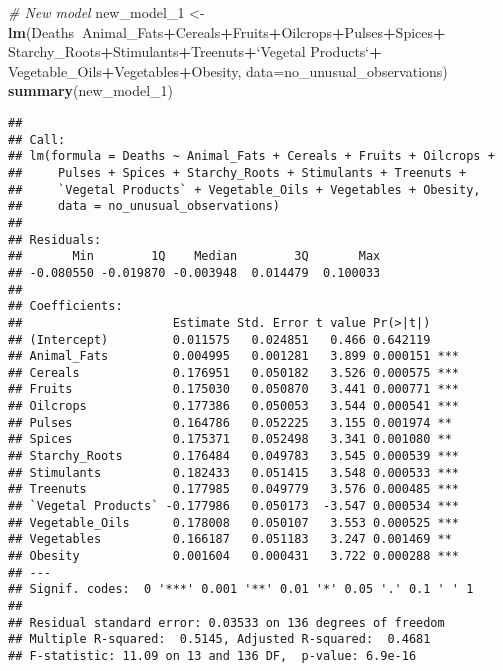 \documentclass[
]{article}
\newenvironment{Shaded}{\begin{snugshade}}{\end{snugshade}}
\newcommand{\CommentTok}[1]{\textcolor[rgb]{0.56,0.35,0.01}{\textit{#1}}}
\newcommand{\DataTypeTok}[1]{\textcolor[rgb]{0.13,0.29,0.53}{#1}}
\newcommand{\DecValTok}[1]{\textcolor[rgb]{0.00,0.00,0.81}{#1}}
\newcommand{\KeywordTok}[1]{\textcolor[rgb]{0.13,0.29,0.53}{\textbf{#1}}}
\newcommand{\NormalTok}[1]{#1}
\newcommand{\OperatorTok}[1]{\textcolor[rgb]{0.81,0.36,0.00}{\textbf{#1}}}
\newcommand{\StringTok}[1]{\textcolor[rgb]{0.31,0.60,0.02}{#1}}
\begin{document}
\begin{Shaded}
\begin{Highlighting}[]
\CommentTok{# New model }
\NormalTok{new_model_}\DecValTok{1}\NormalTok{ <-}\StringTok{ }\KeywordTok{lm}\NormalTok{(Deaths}\OperatorTok{~}\NormalTok{Animal_Fats}\OperatorTok{+}\NormalTok{Cereals}\OperatorTok{+}\NormalTok{Fruits}\OperatorTok{+}\NormalTok{Oilcrops}\OperatorTok{+}\NormalTok{Pulses}\OperatorTok{+}\NormalTok{Spices}\OperatorTok{+}
\StringTok{                    }\NormalTok{Starchy_Roots}\OperatorTok{+}\NormalTok{Stimulants}\OperatorTok{+}\NormalTok{Treenuts}\OperatorTok{+}\StringTok{`}\DataTypeTok{Vegetal Products}\StringTok{`}\OperatorTok{+}
\StringTok{                    }\NormalTok{Vegetable_Oils}\OperatorTok{+}\NormalTok{Vegetables}\OperatorTok{+}\NormalTok{Obesity, }\DataTypeTok{data=}\NormalTok{no_unusual_observations)}
\KeywordTok{summary}\NormalTok{(new_model_}\DecValTok{1}\NormalTok{)}
\end{Highlighting}
\end{Shaded}

\begin{verbatim}
## 
## Call:
## lm(formula = Deaths ~ Animal_Fats + Cereals + Fruits + Oilcrops + 
##     Pulses + Spices + Starchy_Roots + Stimulants + Treenuts + 
##     `Vegetal Products` + Vegetable_Oils + Vegetables + Obesity, 
##     data = no_unusual_observations)
## 
## Residuals:
##       Min        1Q    Median        3Q       Max 
## -0.080550 -0.019870 -0.003948  0.014479  0.100033 
## 
## Coefficients:
##                     Estimate Std. Error t value Pr(>|t|)    
## (Intercept)         0.011575   0.024851   0.466 0.642119    
## Animal_Fats         0.004995   0.001281   3.899 0.000151 ***
## Cereals             0.176951   0.050182   3.526 0.000575 ***
## Fruits              0.175030   0.050870   3.441 0.000771 ***
## Oilcrops            0.177386   0.050053   3.544 0.000541 ***
## Pulses              0.164786   0.052225   3.155 0.001974 ** 
## Spices              0.175371   0.052498   3.341 0.001080 ** 
## Starchy_Roots       0.176484   0.049783   3.545 0.000539 ***
## Stimulants          0.182433   0.051415   3.548 0.000533 ***
## Treenuts            0.177985   0.049779   3.576 0.000485 ***
## `Vegetal Products` -0.177986   0.050173  -3.547 0.000534 ***
## Vegetable_Oils      0.178008   0.050107   3.553 0.000525 ***
## Vegetables          0.166187   0.051183   3.247 0.001469 ** 
## Obesity             0.001604   0.000431   3.722 0.000288 ***
## ---
## Signif. codes:  0 '***' 0.001 '**' 0.01 '*' 0.05 '.' 0.1 ' ' 1
## 
## Residual standard error: 0.03533 on 136 degrees of freedom
## Multiple R-squared:  0.5145, Adjusted R-squared:  0.4681 
## F-statistic: 11.09 on 13 and 136 DF,  p-value: 6.9e-16
\end{verbatim}
\end{document}
